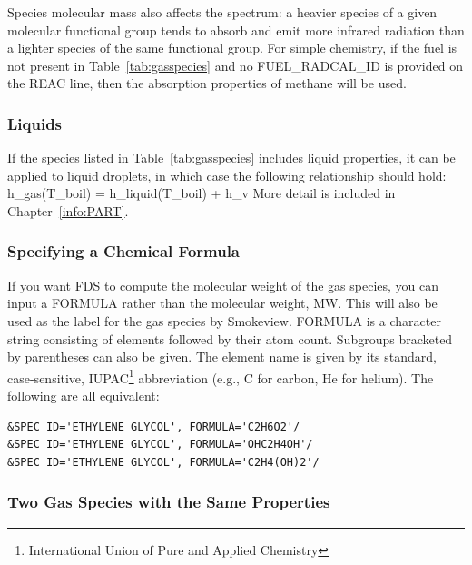 \documentclass[11pt]{book}
\begin{document}
Species molecular mass also affects the spectrum: a heavier species of a given molecular functional group tends to absorb and emit more infrared radiation than a lighter species of the same functional group.  For simple chemistry, if the fuel is not present in Table~\ref{tab:gasspecies} and no {\ct FUEL\_RADCAL\_ID} is provided on the {\ct REAC} line, then the absorption properties of methane will be used.

\subsubsection{Liquids}

If the species listed in Table~\ref{tab:gasspecies} includes liquid properties, it can be applied to liquid droplets, in which case the following relationship should hold:
\be
   h_{\rm gas}(T_{\rm boil}) = h_{\rm liquid}(T_{\rm boil}) + h_{\rm v}
\ee
More detail is included in Chapter~\ref{info:PART}.


\subsubsection{Specifying a Chemical Formula}
\label{info:FORMULA}

If you want FDS to compute the molecular weight of the gas species, you can input a {\ct FORMULA} rather than the molecular weight, {\ct MW}.
This will also be used as the label for the gas species by Smokeview.  {\ct FORMULA} is a character string consisting of elements followed by their atom count.
Subgroups bracketed by parentheses can also be given.  The element name is given by its standard, case-sensitive, IUPAC\footnote{International Union of Pure
and Applied Chemistry} abbreviation (e.g., C for carbon, He for helium).
The following are all equivalent:

\begin{lstlisting}
&SPEC ID='ETHYLENE GLYCOL', FORMULA='C2H6O2'/
&SPEC ID='ETHYLENE GLYCOL', FORMULA='OHC2H4OH'/
&SPEC ID='ETHYLENE GLYCOL', FORMULA='C2H4(OH)2'/
\end{lstlisting}


\subsubsection{Two Gas Species with the Same Properties}
\label{info:SPEC_advanced}
\end{document}
